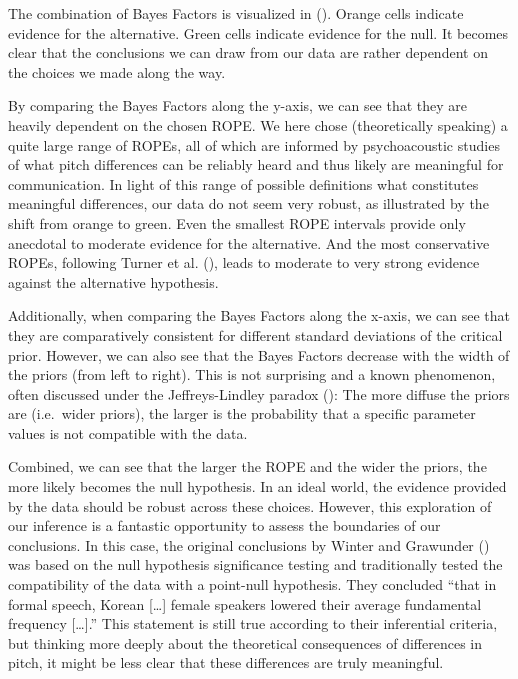 \documentclass[
  doc,
  floatsintext,
  longtable,
  nolmodern,
  notxfonts,
  notimes,
  colorlinks=true,linkcolor=blue,citecolor=blue,urlcolor=blue]{apa7}
\begin{document}
The combination of Bayes Factors is visualized in
().
Orange cells indicate evidence for the alternative. Green cells indicate
evidence for the null. It becomes clear that the conclusions we can draw
from our data are rather dependent on the choices we made along the way.

By comparing the Bayes Factors along the y-axis, we can see that they
are heavily dependent on the chosen ROPE. We here chose (theoretically
speaking) a quite large range of ROPEs, all of which are informed by
psychoacoustic studies of what pitch differences can be reliably heard
and thus likely are meaningful for communication. In light of this range
of possible definitions what constitutes meaningful differences, our
data do not seem very robust, as illustrated by the shift from orange to
green. Even the smallest ROPE intervals provide only anecdotal to
moderate evidence for the alternative. And the most conservative ROPEs,
following Turner et al. (),
leads to moderate to very strong evidence against the alternative
hypothesis.

Additionally, when comparing the Bayes Factors along the x-axis, we can
see that they are comparatively consistent for different standard
deviations of the critical prior. However, we can also see that the
Bayes Factors decrease with the width of the priors (from left to
right). This is not surprising and a known phenomenon, often discussed
under the Jeffreys-Lindley paradox
():
The more diffuse the priors are (i.e.~wider priors), the larger is the
probability that a specific parameter values is not compatible with the
data.

Combined, we can see that the larger the ROPE and the wider the priors,
the more likely becomes the null hypothesis. In an ideal world, the
evidence provided by the data should be robust across these choices.
However, this exploration of our inference is a fantastic opportunity to
assess the boundaries of our conclusions. In this case, the original
conclusions by Winter and Grawunder
() was
based on the null hypothesis significance testing and traditionally
tested the compatibility of the data with a point-null hypothesis. They
concluded ``that in formal speech, Korean {[}\ldots{]} female speakers
lowered their average fundamental frequency {[}\ldots{]}.'' This
statement is still true according to their inferential criteria, but
thinking more deeply about the theoretical consequences of differences
in pitch, it might be less clear that these differences are truly
meaningful.
\end{document}
